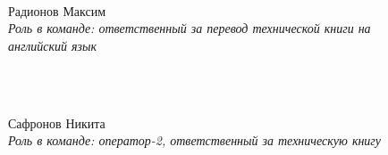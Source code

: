 \begin{figure}[H]
\begin{minipage}[h]{0.47\linewidth}
		\\
		Радионов Максим\\
		\emph{Роль в команде: ответственный за перевод технической книги на английский язык}
	\end{minipage}
	\center  
	\center  
	\vfill 
	\begin{minipage}[h]{0.47\linewidth}
		\\
		Сафронов Никита\\
		\emph{Роль в команде: оператор-2, ответственный за техническую книгу}
	\end{minipage}
	\hfill
	\begin{minipage}[h]{0.47\linewidth}

\end{minipage}
\end{figure}
